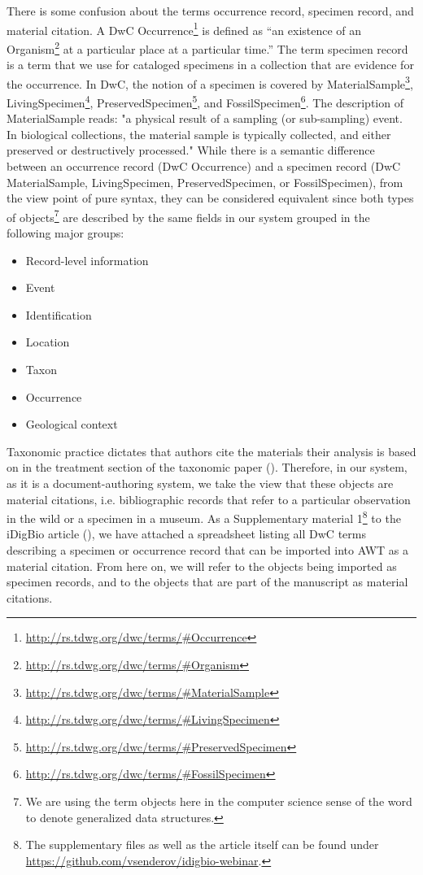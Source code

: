 There is some confusion about the terms occurrence record, specimen record, and material citation. A DwC Occurrence\footnote{\url{http://rs.tdwg.org/dwc/terms/\#Occurrence}} is defined as ``an existence of an Organism\footnote{\url{http://rs.tdwg.org/dwc/terms/\#Organism}} at a particular place at a particular time.'' The term specimen record is a term that we use for cataloged specimens in a collection that are evidence for the occurrence. In DwC, the notion of a specimen is covered by MaterialSample\footnote{\url{http://rs.tdwg.org/dwc/terms/\#MaterialSample}}, LivingSpecimen\footnote{\url{http://rs.tdwg.org/dwc/terms/\#LivingSpecimen}}, PreservedSpecimen\footnote{\url{http://rs.tdwg.org/dwc/terms/\#PreservedSpecimen}}, and FossilSpecimen\footnote{\url{http://rs.tdwg.org/dwc/terms/\#FossilSpecimen}}. The description of MaterialSample reads: "a physical result of a sampling (or sub-sampling) event. In biological collections, the material sample is typically collected, and either preserved or destructively processed." While there is a semantic difference between an occurrence record (DwC Occurrence) and a specimen record (DwC MaterialSample, LivingSpecimen, PreservedSpecimen, or FossilSpecimen), from the view point of pure syntax, they can be considered equivalent since both types of objects\footnote{We are using the term objects here in the computer science sense of the word to denote generalized data structures.} are described by the same fields in our system grouped in the following major groups:

\begin{itemize}
\item{Record-level information}
\item{Event}
\item{Identification}
\item{Location}
\item{Taxon}
\item{Occurrence}
\item{Geological context}
\end{itemize}

Taxonomic practice dictates that authors cite the materials their analysis is based on in the treatment section of the taxonomic paper (\cite{catapano_taxpub:_2010}). Therefore, in our system, as it is a document-authoring system, we take the view that these objects are material citations, i.e. bibliographic records that refer to a particular observation in the wild or a specimen in a museum. As a Supplementary material 1\footnote{The supplementary files as well as the article itself can be found under \url{https://github.com/vsenderov/idigbio-webinar}.} to the iDigBio article (\cite{senderov_online_2016}), we have attached a spreadsheet listing all DwC terms describing a specimen or occurrence record that can be imported into AWT as a material citation. From here on, we will refer to the objects being imported as specimen records, and to the objects that are part of the manuscript as material citations.

